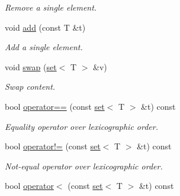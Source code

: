 \begin{DoxyCompactItemize}
\begin{DoxyCompactList}\small\item\em Remove a single element. \end{DoxyCompactList}\item 
\hypertarget{classmerlin_1_1set_a12ca303df4af43659a892188eeda5272}{}void \hyperlink{classmerlin_1_1set_a12ca303df4af43659a892188eeda5272}{add} (const T \&t)\label{classmerlin_1_1set_a12ca303df4af43659a892188eeda5272}

\begin{DoxyCompactList}\small\item\em Add a single element. \end{DoxyCompactList}\item 
\hypertarget{classmerlin_1_1set_a52af645785b5b689c95ddb4d0e2774dc}{}void \hyperlink{classmerlin_1_1set_a52af645785b5b689c95ddb4d0e2774dc}{swap} (\hyperlink{classmerlin_1_1set}{set}$<$ T $>$ \&v)\label{classmerlin_1_1set_a52af645785b5b689c95ddb4d0e2774dc}

\begin{DoxyCompactList}\small\item\em Swap content. \end{DoxyCompactList}\item 
\hypertarget{classmerlin_1_1set_a4721e77f71f2771f4c5b3873f4f3259f}{}bool \hyperlink{classmerlin_1_1set_a4721e77f71f2771f4c5b3873f4f3259f}{operator==} (const \hyperlink{classmerlin_1_1set}{set}$<$ T $>$ \&t) const \label{classmerlin_1_1set_a4721e77f71f2771f4c5b3873f4f3259f}

\begin{DoxyCompactList}\small\item\em Equality operator over lexicographic order. \end{DoxyCompactList}\item 
\hypertarget{classmerlin_1_1set_aafa2d337583501c51a520d46f64a3ef3}{}bool \hyperlink{classmerlin_1_1set_aafa2d337583501c51a520d46f64a3ef3}{operator!=} (const \hyperlink{classmerlin_1_1set}{set}$<$ T $>$ \&t) const \label{classmerlin_1_1set_aafa2d337583501c51a520d46f64a3ef3}

\begin{DoxyCompactList}\small\item\em Not-\/equal operator over lexicographic order. \end{DoxyCompactList}\item 
\hypertarget{classmerlin_1_1set_ae1e9ec4a3a6cc07b5a04b1e6605b7b22}{}bool \hyperlink{classmerlin_1_1set_ae1e9ec4a3a6cc07b5a04b1e6605b7b22}{operator$<$} (const \hyperlink{classmerlin_1_1set}{set}$<$ T $>$ \&t) const \label{classmerlin_1_1set_ae1e9ec4a3a6cc07b5a04b1e6605b7b22}


\end{DoxyCompactItemize}
